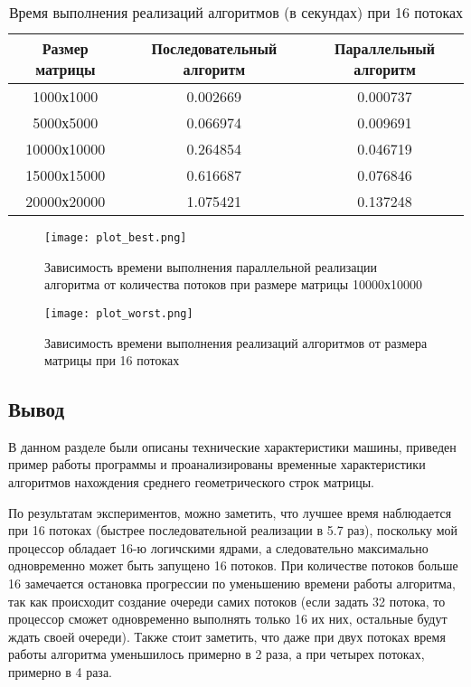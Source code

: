 \begin{table}[p]
    \caption{\centering Время выполнения реализаций алгоритмов (в секундах) при 16 потоках}
    \centering
    \begin{tabular}{|c|c|c|}
    \hline
    Размер матрицы & Последовательный алгоритм & Параллельный алгоритм\\ \hline
    1000х1000      & 0.002669 & 0.000737 \\ \hline
    5000х5000      & 0.066974 & 0.009691 \\ \hline
    10000х10000    & 0.264854 & 0.046719 \\ \hline
    15000х15000    & 0.616687 & 0.076846 \\ \hline
    20000х20000    & 1.075421 & 0.137248 \\ \hline
    \end{tabular}
    \label{tab:time_comp}
\end{table}

\clearpage

\begin{figure}
    \centering
    \texttt{[image: plot\_best.png]}
    \caption{Зависимость времени выполнения параллельной реализации алгоритма от количества потоков при размере матрицы 10000х10000}
    \label{img:plot_best}
\end{figure}

\begin{figure}
    \centering
    \texttt{[image: plot\_worst.png]}
    \caption{Зависимость времени выполнения реализаций алгоритмов от размера матрицы при 16 потоках}
    \label{img:plot_worst}
\end{figure}

\clearpage

\subsection{Вывод}

В данном разделе были описаны технические характеристики машины, приведен пример работы программы и проанализированы временные характеристики алгоритмов нахождения среднего геометрического строк матрицы.

По результатам экспериментов, можно заметить, что лучшее время наблюдается при 16 потоках (быстрее последовательной реализации в 5.7 раз), поскольку мой процессор обладает 16-ю логичскими ядрами, а следовательно максимально одновременно может быть запущено 16 потоков. При количестве потоков больше 16 замечается остановка прогрессии по уменьшению времени работы алгоритма, так как происходит создание очереди самих потоков (если задать 32 потока, то процессор сможет одновременно выполнять только 16 их них, остальные будут ждать своей очереди).
Также стоит заметить, что даже при двух потоках время работы алгоритма уменьшилось примерно в 2 раза, а при четырех потоках, примерно в 4 раза.

